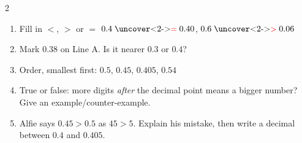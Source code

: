 \documentclass{beamer}
\newcommand{\ashow}[1]{\uncover<2->{\textcolor{red}{\small #1}}}
\begin{document}
\begin{frame}
\begin{columns}[T]
\begin{multicols}{2}
\begin{enumerate}
  \item Fill in $<$, $>$ or $=$ $0.4 \mathrel{\text{\ashow{$=$}}} 0.40$, $0.6 \mathrel{\text{\ashow{$>$}}} 0.06$

\vspace{0.5em}

  \item Mark $0.38$ on Line A. Is it nearer $0.3$ or $0.4$? \ashow{nearer $0.4$}

  \columnbreak

  \item Order, smallest first: $0.5$, $0.45$, $0.405$, $0.54$ \ashow{$0.405$, $0.45$, $0.5$, $0.54$}

  \vspace{0.2em}

  \item True or false: more digits \emph{after} the decimal point means a bigger number? Give an example/counter-example. \ashow{False: $0.9>0.1234$}

  \vspace{0.2em}

  \item Alfie says $0.45>0.5$ as $45>5$. Explain his mistake, then write a decimal between $0.4$ and $0.405$. \ashow{$0.5$ has $5$ tenths; e.g.\ $0.402$}

\end{enumerate}
\end{multicols}

\end{columns}

\end{frame}
\end{document}

